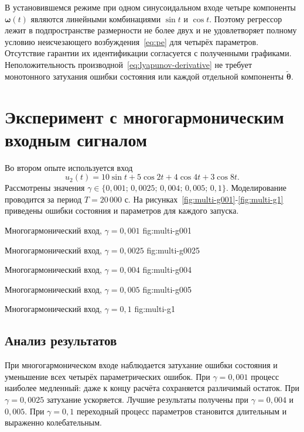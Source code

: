 В установившемся режиме при одном синусоидальном входе
четыре компоненты $\bm\omega(t)$ являются линейными комбинациями
$\sin t$ и $\cos t$. Поэтому регрессор лежит в подпространстве
размерности не более двух и не удовлетворяет полному условию
неисчезающего возбуждения~\eqref{eq:pe} для четырёх параметров.
Отсутствие гарантии их идентификации согласуется с полученными графиками.
Неположительность производной~\eqref{eq:lyapunov-derivative}
не требует монотонного затухания ошибки состояния
или каждой отдельной компоненты $\tilde{\bm\theta}$.


\section{Эксперимент с многогармоническим входным сигналом}

Во втором опыте используется вход
\begin{equation}
  u_2(t)=10\sin t+5\cos 2t+4\cos 4t+3\cos 8t.
\end{equation}
Рассмотрены значения
$\gamma\in\{0{,}001;\,0{,}0025;\,0{,}004;\,0{,}005;\,0{,}1\}$.
Моделирование проводится за период $T=20\,000$ с.
На рисунках~\ref{fig:multi-g001}-\ref{fig:multi-g1}
приведены ошибки состояния и параметров для каждого запуска.

  {Многогармонический вход, $\gamma=0{,}001$}
  {fig:multi-g001}

  {Многогармонический вход, $\gamma=0{,}0025$}
  {fig:multi-g0025}

  {Многогармонический вход, $\gamma=0{,}004$}
  {fig:multi-g004}

  {Многогармонический вход, $\gamma=0{,}005$}
  {fig:multi-g005}

  {Многогармонический вход, $\gamma=0{,}1$}
  {fig:multi-g1}


\subsection{Анализ результатов}

При многогармоническом входе наблюдается затухание
ошибки состояния и уменьшение всех четырёх параметрических ошибок.
При $\gamma=0{,}001$ процесс наиболее медленный:
даже к концу расчёта сохраняется различимый остаток.
При $\gamma=0{,}0025$ затухание ускоряется.
Лучшие результаты получены при
$\gamma=0{,}004$ и $0{,}005$.
При $\gamma=0{,}1$ переходный процесс параметров становится
длительным и выраженно колебательным.


